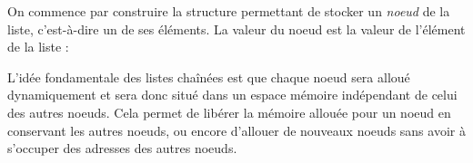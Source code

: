 \documentclass[../../../main.tex]{subfiles}
\begin{document}
On commence par construire la structure permettant de stocker un \textit{noeud} de la liste, c'est-à-dire un de ses éléments. La valeur du noeud est la valeur de l'élément de la liste :
 
\begin{minipage}{\textwidth}
	\begin{center}
		
		\label{img:node}
	\end{center}
\end{minipage}

L'idée fondamentale des listes chaînées est que chaque noeud sera alloué dynamiquement et sera donc situé dans un espace mémoire indépendant de celui des autres noeuds. Cela permet de libérer la mémoire allouée pour un noeud en conservant les autres noeuds, ou encore d'allouer de nouveaux noeuds sans avoir à s'occuper des adresses des autres noeuds.
\end{document}
